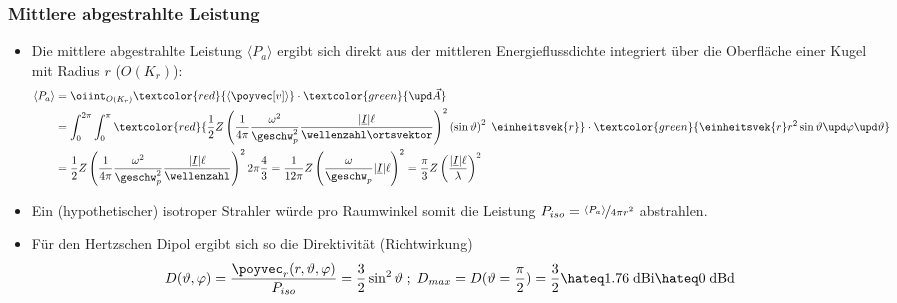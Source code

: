 \begin{frame}
  \frametitle{Mittlere abgestrahlte Leistung}
  \begin{itemize}[<+->]
  \item Die mittlere abgestrahlte Leistung \(\langle P_a \rangle\) ergibt sich direkt aus der mittleren Energieflussdichte integriert über die Oberfläche einer Kugel mit Radius \(r\) (\(O(K_r)\)):
    \begin{align*}
      \langle P_a \rangle &= \oiint_{O(K_r)} \textcolor{red}{\langle \poyvec[v] \rangle} \cdot \textcolor{green}{\upd\vec{A}} \\
      &= \int_0^{2\pi}\int_0^\pi \textcolor{red}{\frac{1}{2} Z \left( \frac{1}{4\pi} \frac{\omega^2}{\geschw_p^2}\frac{|\underline{I}| \ell}{\wellenzahl\ortsvektor} \right)^2 \left(\sin\vartheta\right)^2 \; \einheitsvek{r}} \cdot \textcolor{green}{\einheitsvek{r} r^2\sin\vartheta \upd\varphi\upd\vartheta}  \\
      &= \frac{1}{2} Z \left( \frac{1}{4\pi} \frac{\omega^2}{\geschw_p^2}\frac{|\underline{I}| \ell}{\wellenzahl} \right)^2 2\pi \frac{4}{3} = \frac{1}{12\pi} Z \left( \frac{\omega}{\geschw_p}|\underline{I}| \ell \right)^2 = \frac{\pi}{3} Z \left( \frac{|\underline{I}| \ell}{\lambda} \right)^2 
    \end{align*}
  \item Ein (hypothetischer) \alert{isotroper Strahler} würde pro Raumwinkel somit die Leistung \(P_{iso}= \nicefrac{\langle P_a \rangle}{4\pi r^2} \) abstrahlen.
  \item Für den Hertzschen Dipol ergibt sich so die \alert{Direktivität} (Richtwirkung)
    \begin{equation*}
      D(\vartheta,\varphi) = \frac{\poyvec_r(r,\vartheta, \varphi)}{P_{iso}} = \frac{3}{2} \sin^2\vartheta \; ; \; D_{max} = D(\vartheta=\frac{\pi}{2}) = \frac{3}{2} \hateq 1.76\; \text{dBi} \hateq 0\; \text{dBd}  
      \end{equation*}
 \end{itemize}
  \end{frame}

